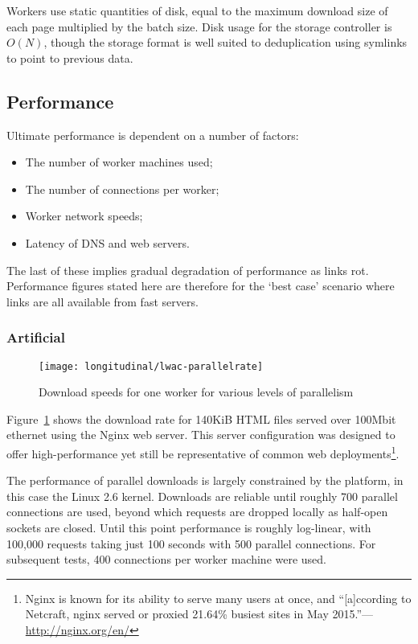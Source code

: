 Workers use static quantities of disk, equal to the maximum download size of each page multiplied by the batch size.  Disk usage for the storage controller is $O(N)$,  though the storage format is well suited to deduplication using symlinks to point to previous data.


\subsection{Performance}
Ultimate performance is dependent on a number of factors:

\begin{itemize}
    \item The number of worker machines used;
    \item The number of connections per worker;
    \item Worker network speeds;
    \item Latency of DNS and web servers.
\end{itemize}

The last of these implies gradual degradation of performance as links rot.  Performance figures stated here are therefore for the `best case' scenario where links are all available from fast servers.


\subsubsection{Artificial}


\begin{figure}[Ht]
    \centering
    \texttt{[image: longitudinal/lwac-parallelrate]}
    \caption{Download speeds for one worker for various levels of parallelism}
    \label{fig:longitudinal:lwac:parallelrate}
\end{figure}

Figure~\ref{fig:longitudinal:lwac:parallelrate} shows the download rate for 140KiB HTML files served over 100Mbit ethernet using the Nginx web server.  This server configuration was designed to offer high-performance yet still be representative of common web deployments\footnote{Nginx is known for its ability to serve many users at once, and ``[a]ccording to Netcraft, nginx served or proxied 21.64\% busiest sites in May 2015.''---\url{http://nginx.org/en/}}.

The performance of parallel downloads is largely constrained by the platform, in this case the Linux 2.6 kernel.  Downloads are reliable until roughly 700 parallel connections are used, beyond which requests are dropped locally as half-open sockets are closed.  Until this point performance is roughly log-linear, with 100,000 requests taking just 100 seconds with 500 parallel connections.  For subsequent tests, 400 connections per worker machine were used.


